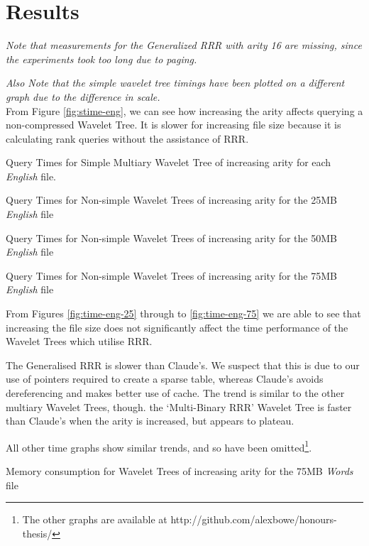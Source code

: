 \section{Results}
\label{sec:results}
\emph{Note that measurements for the Generalized RRR with arity 16 are missing, since the experiments took too long due to paging.}

\emph{Also Note that the simple wavelet tree timings have been plotted on a different graph 
due to the difference in scale.}\\

From Figure \ref{fig:stime-eng}, we can see how increasing the arity affects
querying a non-compressed Wavelet Tree. It is slower for increasing file size
because it is calculating rank queries without the assistance of RRR.


			{Query Times for Simple Multiary Wavelet Tree of increasing arity
			for each \emph{English} file.}
		
			{Query Times for Non-simple Wavelet Trees of increasing arity
			for the 25MB \emph{English} file}
		
			{Query Times for Non-simple Wavelet Trees of increasing arity
			for the 50MB \emph{English} file}
		
			{Query Times for Non-simple Wavelet Trees of increasing arity
			for the 75MB \emph{English} file}

From Figures \ref{fig:time-eng-25} through to \ref{fig:time-eng-75} we are able 
to see that increasing the file size does not significantly affect the time
performance of the Wavelet Trees which utilise RRR.

The Generalised RRR is slower than Claude's. We suspect that this is due to our 
use of pointers required to create a sparse table, whereas Claude's avoids 
dereferencing and makes better use of cache. The trend is similar to the
other multiary Wavelet Trees, though. the `Multi-Binary RRR' Wavelet Tree
is faster than Claude's when the arity is increased, but appears to plateau.

All other time graphs show similar trends, and so have been omitted\footnote{The 
other graphs are available at http://github.com/alexbowe/honours-thesis/}.

			{Memory consumption for Wavelet Trees of increasing arity for
			the 75MB \emph{Words} file}

